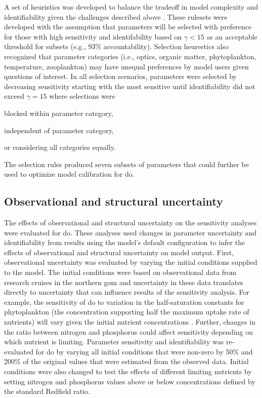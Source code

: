 \documentclass[letterpaper,12pt,oneside]{article}\usepackage[]{graphicx}\usepackage[]{color}
\begin{document}
A set of heuristics was developed to balance the tradeoff in model complexity and identifiability given the challenges described above \citep[see also][]{Wagener01}.  These rulesets were developed with the assumption that parameters will be selected with preference for those with high sensitivity and identifability based on $\gamma < 15$ as an acceptable threshold for subsets (e.g., 93\% accountability).  Selection heurestics also recognized that parameter categories (i.e., optics, organic matter, phytoplankton, temperature, zooplankton) may have unequal preferences by model users given questions of interest.  In all selection scenarios, parameters were selected by decreasing sensitivity starting with the most sensitive until identifiability did not exceed $\gamma = 15$ where selections were \begin{inparaenum}[1\upshape)]
\item blocked within parameter category,
\item independent of parameter category,
\item or considering all categories equally.
\end{inparaenum} The selection rules produced seven subsets of parameters that could further be used to optimize model calibration for \ac{do}.

\subsection{Observational and structural uncertainty}

The effects of observational and structural uncertainty on the sensitivity analyses were evaluated for \ac{do}.  These analyses used changes in parameter uncertainty and identifiability from results using the model's default configuration to infer the effects of observational and structural uncertainty on model output.  First, observational uncertainty was evaluated by varying the initial conditions supplied to the model.  The initial conditions were based on observational data from research cruises in the northern \ac{gom} \citep{Murrell14} and uncertainty in these data translates directly to uncertainty that can influence results of the sensitivity analysis.  For example, the sensitivity of \ac{do} to variation in the half-saturation constants for phytoplankton (the concentration supporting half the maximum uptake rate of nutrients) will vary given the initial nutrient concentrations \citep{Eppley69}.  Further, changes in the ratio between nitrogen and phosphorus could affect sensitivity depending on which nutrient is limiting.  Parameter sensitivity and identifiability was re-evaluated for \ac{do} by varying all initial conditions that were non-zero by 50\% and 200\% of the original values that were estimated from the observed data.  Initial conditions were also changed to test the effects of different limiting nutrients by setting nitrogen and phosphorus values above or below concentrations defined by the standard Redfield ratio.  
\end{document}
